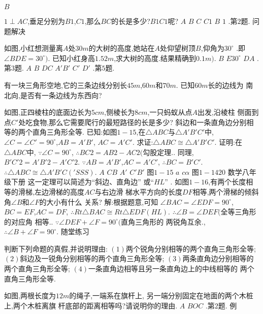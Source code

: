 \documentclass[cn,blue,12pt]{elegantbook}
\begin{document}
\begin{liti}[resume]
\(B\)
\item \( 1 \perp AC\),垂足分别为\( B1\),\( C1\),那么\( BC \)的长是多少?\( B1C1 \)呢?
\(A\)
\(B\)
\(C\)
\(C1\)
\(B\)
\(1\)
.第\( 2 \)题.
问题解决
\item 如图,小红想测量离\( A \)处\( 30 m \)的大树的高度,她站在\( A \)处仰望树顶\( B\),仰角为\( 30 ^\circ \)
.即\( \angle BDE = 30 ^\circ ) \). 已知小红身高\( 1.52 m\),求大树的高度.结果精确到\( 0.1 m) \). 
\(B\)
\(E 30 ^\circ \)
\(D A\)
.第\( 3 \)题.
\(A\)
\(B\)
\(D C\)
\(A′ B′\)
\(C′\)
\(D′\)
.第\( 5 \)题.
\item 有一块三角形空地,它的三条边线分别长\( 45 m\),\( 60 m \)和\( 70 m\). 已知\( 60 m \)长的边线为
南北向,是否有一条边线为东西向?
\item 如图,正四棱柱的底面边长为\( 5 cm\),侧棱长为\( 8 cm\),一只蚂蚁从点\( A \)出发,沿棱柱
侧面到点\( C′ \)处吃食物,那么它需要爬行的最短路径的长是多少?
斜边和一条直角边分别相等的两个直角三角形全等. 
已知:如图\( 1-15\),在\( \triangle ABC \)与\( \triangle A′B′C′ \)中,\( \angle  C = \angle C′ = 90 ^\circ \),\( AB = A′B′\),
\(AC =A′C′\). 
求证:\( \triangle ABC \cong   \triangle A′B′C′\). 
证明:在\( \triangle ABC \)中,
\( \because \angle  C = 90 ^\circ \),
\( \therefore BC2 = AB2 - AC2( \)勾股定理.. 
同理,\( B′C′2 = A′B′2 - A′C′2\). 
\( \because AB = A′B′\),\( AC = A′C′\),
\( \therefore BC = B′C′\). 
\( \therefore \triangle ABC \cong   \triangle A′B′C(′ SSS) \). 
\(A\)
\(C B\)
\(A′\)
\(C′ B′\)
图\( 1-15\)
\(a\)
\(c \alpha \)
图\( 1-1420\)
数学\(  \)八年级\(  \)下册
这一定理可以简述为``斜边、直角边'' 或``\( HL\)'' . 
如图\( 1-16\),有两个长度相等的滑梯,左边滑梯的高度\( AC \)与右边滑
梯水平方向的长度\( DF \)相等,两个滑梯的倾斜角\( \angle  B \)和\( \angle  F \)的大小有什么
关系?
解:根据题意,可知
\(    \angle  BAC = \angle EDF = 90 ^\circ \),
\(BC = EF\),\( AC = DF\),
\( \therefore Rt \triangle BAC \cong  Rt \triangle EDF( HL) \). 
\( \therefore \angle  B = \angle  DEF( \)全等三角形的对应角
相等.. 
\( \because \angle  DEF + \angle  F = 90 ^\circ ( \)直角三角形的
两锐角互余.,
\( \therefore \angle  B + \angle  F = 90 ^\circ \). 
随堂练习
\item 判断下列命题的真假,并说明理由:
\(( 1) \)两个锐角分别相等的两个直角三角形全等;
\(( 2) \)斜边及一锐角分别相等的两个直角三角形全等;
\(( 3) \)两条直角边分别相等的两个直角三角形全等;
\(( 4) \)一条直角边相等且另一条直角边上的中线相等的
两个直角三角形全等. 
\item 如图,两根长度为\( 12 m \)的绳子,一端系在旗杆上,
另一端分别固定在地面的两个木桩上,两个木桩离旗
杆底部的距离相等吗?请说明你的理由. 
\(A\)
\(B O C\)
.第\( 2 \)题.
例

\end{liti}
\end{document}
